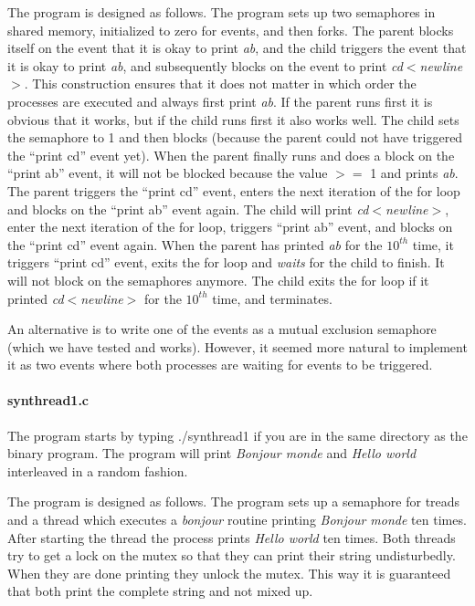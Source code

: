 \documentclass[a4paper,10pt]{article}
\begin{document}
The program is designed as follows. The program sets up two semaphores in shared memory, initialized to zero for events, and then forks. The parent blocks itself on the event that it is okay to print \emph{ab}, and the child triggers the event that it is okay to print \emph{ab}, and subsequently blocks on the event to print \emph{cd$<$newline$>$}. This construction ensures that it does not matter in which order the processes are executed and always first print \emph{ab}. If the parent runs first it is obvious that it works, but if the child runs first it also works well. The child sets the semaphore to 1 and then blocks (because the parent could not have triggered the ``print cd'' event yet). When the parent finally runs and does a block on the ``print ab'' event, it will not be blocked because the value $>=$ 1 and prints \emph{ab}. The parent triggers the ``print cd'' event, enters the next iteration of the for loop and blocks on the ``print ab'' event again. The child will print \emph{cd$<$newline$>$}, enter the next iteration of the for loop, triggers ``print ab'' event, and blocks on the ``print cd'' event again. When the parent has printed \emph{ab} for the $10^{th}$ time, it triggers ``print cd'' event, exits the for loop and \emph{waits} for the child to finish. It will not block on the semaphores anymore. The child exits the for loop if it printed \emph{cd$<$newline$>$} for the $10^{th}$ time, and terminates.

An alternative is to write one of the events as a mutual exclusion semaphore (which we have tested and works). However, it seemed more natural to implement it as two events where both processes are waiting for events to be triggered.

\paragraph{synthread1.c} The program starts by typing ./synthread1 if you are in the same directory as the binary program. The program will print \emph{Bonjour monde} and \emph{Hello world} interleaved in a random fashion.

The program is designed as follows. The program sets up a semaphore for treads and a thread which executes a \emph{bonjour} routine printing \emph{Bonjour monde} ten times. After starting the thread the process prints \emph{Hello world} ten times. Both threads try to get a lock on the mutex so that they can print their string undisturbedly. When they are done printing they unlock the mutex. This way it is guaranteed that both print the complete string and not mixed up.
\end{document}
